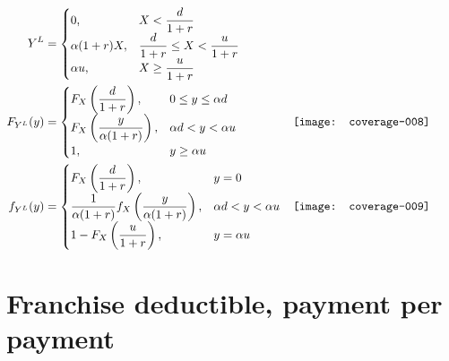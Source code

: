 \documentclass{article}
\newcommand{\D}{\displaystyle}
\begin{document}
\begin{align*}
  Y^L
  &=
  \begin{cases}
    0,
      & X < \D \frac{d}{1 + r} \\
    \alpha (1 + r) X,
      & \D\frac{d}{1 + r} \leq X < \frac{u}{1 + r} \\
    \alpha u,
      & \D X \geq \frac{u}{1 + r}
  \end{cases} & \\
  F_{Y^L}(y)
  &=
  \begin{cases}
    F_X \left( \D\frac{d}{1 + r} \right),
      & 0 \leq y \leq \alpha d \\
    F_X \left( \D\frac{y}{\alpha(1 + r)} \right),
      & \alpha d < y < \alpha u \\
    1,
      & y \geq \alpha u
  \end{cases} &
  \begin{minipage}{0.4\linewidth}
\texttt{[image: coverage-008]}
  \end{minipage} \\
  f_{Y^L}(y)
  &=
  \begin{cases}
    F_X \left( \D\frac{d}{1 + r} \right),
      & y = 0 \\
    \D\frac{1}{\alpha (1 + r)} f_X \left( \D\frac{y}{\alpha(1 + r)} \right),
      & \alpha d < y < \alpha u \\
    1 - F_X \left( \D\frac{u}{1 + r} \right),
      & y = \alpha u
  \end{cases} &
  \begin{minipage}{0.4\linewidth}
\texttt{[image: coverage-009]}
  \end{minipage}
\end{align*}


\section{Franchise deductible, payment per payment}
\end{document}
